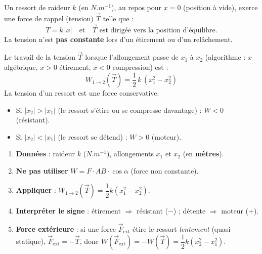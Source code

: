 \documentclass[11pt]{article}
\newcommand{\cle}[1]{{\popxbold\color{popdark}#1}}
\begin{document}
\begin{definition}
Un ressort de raideur $k$ (en $\si{N.m^{-1}}$), au repos pour $x=0$ (position à vide), exerce une force de rappel (tension) $\vec{T}$ telle que :
\[ T = k\,|x| \quad \text{et} \quad \vec{T} \text{ est dirigée vers la position d'équilibre.} \]
La tension n'est \textbf{pas constante} lors d'un étirement ou d'un relâchement.
\end{definition}

\begin{propriete}
Le travail de la tension $\vec{T}$ lorsque l'allongement passe de $x_1$ à $x_2$ (algorithme : $x$ algébrique, $x>0$ étirement, $x<0$ compression) est :
\[ W_{1\to 2}(\vec{T}) = \dfrac{1}{2}\,k\,\left(x_1^{2} - x_2^{2}\right) \]
La tension d'un ressort est une force \cle{conservative}.
\begin{itemize}
\item Si $|x_2| > |x_1|$ (le ressort s'étire ou se compresse davantage) : $W < 0$ (résistant).
\item Si $|x_2| < |x_1|$ (le ressort se détend) : $W > 0$ (moteur).
\end{itemize}
\end{propriete}

\begin{methode}
\begin{enumerate}
\item \textbf{Données} : raideur $k$ ($\si{N.m^{-1}}$), allongements $x_1$ et $x_2$ (en \textbf{mètres}).
\item \textbf{Ne pas utiliser} $W = F\cdot AB\cdot\cos\alpha$ (force non constante).
\item \textbf{Appliquer} : $W_{1\to 2}(\vec{T}) = \dfrac{1}{2}k(x_1^2 - x_2^2)$.
\item \textbf{Interpréter le signe} : étirement $\Rightarrow$ résistant ($-$) ; détente $\Rightarrow$ moteur ($+$).
\item \textbf{Force extérieure} : si une force $\vec{F}_{\text{ext}}$ étire le ressort \emph{lentement} (quasi-statique), $\vec{F}_{\text{ext}} = -\vec{T}$, donc $W(\vec{F}_{\text{ext}}) = -W(\vec{T}) = \dfrac{1}{2}k(x_2^2 - x_1^2)$.
\end{enumerate}
\end{methode}
\end{document}
